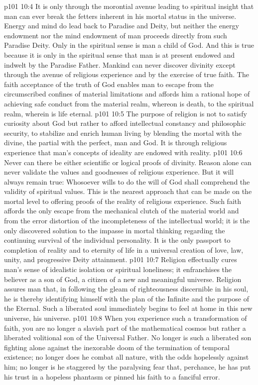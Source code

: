 \vs p101 10:4 It is only through the morontial avenue leading to spiritual insight that man can ever break the fetters inherent in his mortal status in the universe. Energy and mind do lead back to Paradise and Deity, but neither the energy endowment nor the mind endowment of man proceeds directly from such Paradise Deity. Only in the spiritual sense is man a child of God. And this is true because it is only in the spiritual sense that man is at present endowed and indwelt by the Paradise Father. Mankind can never discover divinity except through the avenue of religious experience and by the exercise of true faith. The faith acceptance of the truth of God enables man to escape from the circumscribed confines of material limitations and affords him a rational hope of achieving safe conduct from the material realm, whereon is death, to the spiritual realm, wherein is life eternal.
\vs p101 10:5 \pc The purpose of religion is not to satisfy curiosity about God but rather to afford intellectual constancy and philosophic security, to stabilize and enrich human living by blending the mortal with the divine, the partial with the perfect, man and God. It is through religious experience that man’s concepts of ideality are endowed with reality.
\vs p101 10:6 \pc Never can there be either scientific or logical proofs of divinity. Reason alone can never validate the values and goodnesses of religious experience. But it will always remain true: Whosoever wills to do the will of God shall comprehend the validity of spiritual values. This is the nearest approach that can be made on the mortal level to offering proofs of the reality of religious experience. Such faith affords the only escape from the mechanical clutch of the material world and from the error distortion of the incompleteness of the intellectual world; it is the only discovered solution to the impasse in mortal thinking regarding the continuing survival of the individual personality. It is the only passport to completion of reality and to eternity of life in a universal creation of love, law, unity, and progressive Deity attainment.
\vs p101 10:7 Religion effectually cures man’s sense of idealistic isolation or spiritual loneliness; it enfranchises the believer as a son of God, a citizen of a new and meaningful universe. Religion assures man that, in following the gleam of righteousness discernible in his soul, he is thereby identifying himself with the plan of the Infinite and the purpose of the Eternal. Such a liberated soul immediately begins to feel at home in this new universe, his universe.
\vs p101 10:8 When you experience such a transformation of faith, you are no longer a slavish part of the mathematical cosmos but rather a liberated volitional son of the Universal Father. No longer is such a liberated son fighting alone against the inexorable doom of the termination of temporal existence; no longer does he combat all nature, with the odds hopelessly against him; no longer is he staggered by the paralysing fear that, perchance, he has put his trust in a hopeless phantasm or pinned his faith to a fanciful error.
